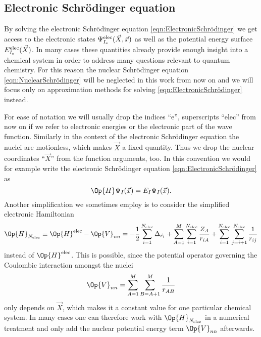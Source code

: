 \subsection{Electronic Schrödinger equation}
\label{sec:ElectronicSchrödinger}
By solving the electronic Schrödinger equation \eqref{eqn:ElectronicSchrödinger}
we get access to the electronic states $\Psi^\text{elec}_{I_\text{e}}(\vec{X}, \vec{x})$
as well as the potential energy surface $E^\text{elec}_{I_\text{e}}(\vec{X})$.
In many cases these quantities already provide
enough insight into a chemical system in order to address many
questions relevant to quantum chemistry.
For this reason the nuclear Schrödinger equation \eqref{eqn:NuclearSchrödinger}
will be neglected in this work from now on
and we will focus only
on approximation methods for solving \eqref{eqn:ElectronicSchrödinger} instead.

For ease of notation we will usually drop the indices ``e'',
superscripts ``elec'' from now on if we refer to electronic energies
or the electronic part of the wave function.
Similarly in the context of the electronic Schrödinger equation
the nuclei are motionless, which makes $\vec{X}$ a fixed quantity.
Thus we drop the nuclear coordinates ``$\vec{X}$''
from the function arguments, too.
In this convention we would for example
write the electronic Schrödinger equation \eqref{eqn:ElectronicSchrödinger} as
\[ \Op{H} \Psi_I(\vec{x}) = E_I \Psi_I(\vec{x}). \]
Another simplification we sometimes employ is to consider
the simplified electronic Hamiltonian
\begin{equation}
	\Op{H}_{\Nelec} \equiv \Op{H}^\text{elec} - \Op{V}_{nn}
	= -\frac12 \sum_{i=1}^{\Nelec} \Delta_{\vec{r}_i}
	+ \sum_{A=1}^M \sum_{i=1}^{\Nelec} \frac{Z_A}{r_{iA}}
	+ \sum_{i=1}^{\Nelec} \sum_{j=i+1}^{\Nelec} \frac{1}{r_{ij}}
	\label{eqn:ElectronicHamiltonian}
\end{equation}
instead of $\Op{H}^\text{elec}$.
This is possible, since the potential operator governing the Coulombic interaction
amongst the nuclei
\[
	\Op{V}_{nn} = \sum_{A=1}^M \sum_{B=A+1}^M \frac1{r_{AB}}
\]
only depends on $\vec{X}$, which makes it a constant value for one particular chemical system.
In many cases one can therefore work with $\Op{H}_{\Nelec}$
in a numerical treatment and only add the nuclear potential energy term $\Op{V}_{nn}$
afterwards.

